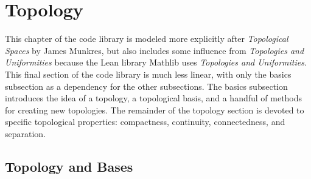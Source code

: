 \section{Topology}

This chapter of the code library is modeled more explicitly after 
\textit{Topological Spaces} by James Munkres, but also includes
some influence from \textit{Topologies and Uniformities} because 
the Lean library Mathlib uses \textit{Topologies and Uniformities}.
This final section of the code library is much less linear, with only the
basics subsection as a dependency for the other subsections. The basics
subsection introduces the idea of a topology, a topological basis, and 
a handful of methods for creating new topologies. The remainder of the 
topology section is devoted to specific topological properties:
compactness, continuity, connectedness, and separation.

\subsection{Topology and Bases}

